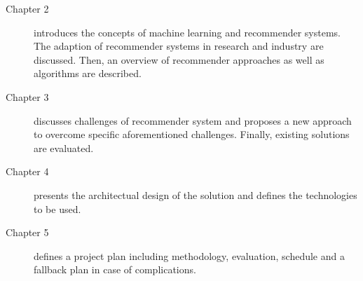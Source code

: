 \begin{description}
    \item[Chapter 2] introduces the concepts of machine learning and recommender systems. The adaption of recommender systems in research and industry are discussed. Then, an overview of recommender approaches as well as algorithms are described.
    \item[Chapter 3] discusses challenges of recommender system and proposes a new approach to overcome specific aforementioned challenges. Finally, existing solutions are evaluated.
    \item[Chapter 4] presents the architectual design of the solution and defines the technologies to be used.
    \item[Chapter 5] defines a project plan including methodology, evaluation, schedule and a fallback plan in case of complications.
\end{description}